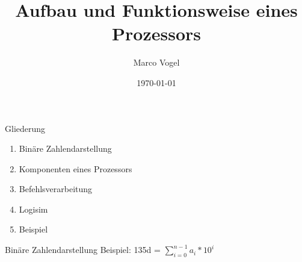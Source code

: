 \documentclass{beamer}
\title{Aufbau und Funktionsweise eines Prozessors}
\author{Marco Vogel}
\institute{Hochschule Hof}
\date{\today}
\begin{document}
\begin{frame}
\titlepage
\end{frame}

\begin{frame}{Gliederung}
\begin{enumerate}
\item{Bin\"are Zahlendarstellung}
\item{Komponenten eines Prozessors}
\item{Befehlsverarbeitung}
\item{Logisim}
\item{Beispiel}
\end{enumerate}
\end{frame}

\begin{frame}{Bin\"are Zahlendarstellung}
Beispiel: 135d = $\sum\limits_{i=0}^{n-1} a_i * 10^i$
\end{frame}
\end{document}

